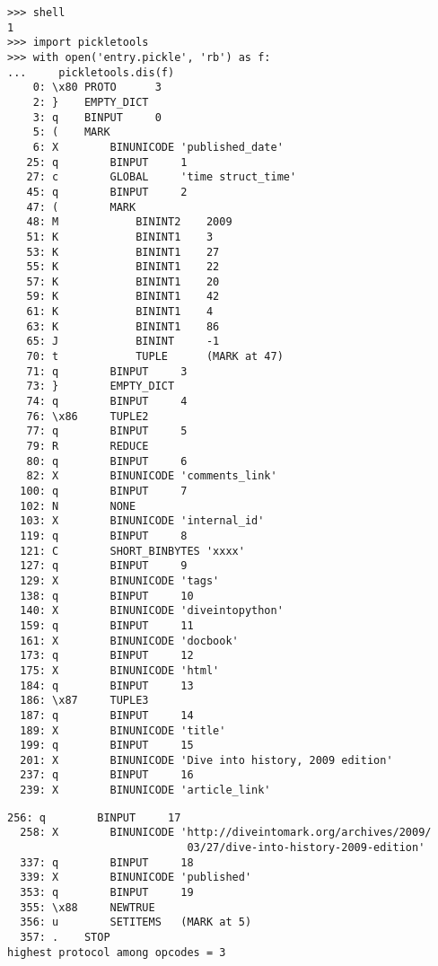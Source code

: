 \noindent\begin{minipage}{\textwidth}
\begin{lstlisting}[mathescape=False]
>>> shell
1
>>> import pickletools
>>> with open('entry.pickle', 'rb') as f:
...     pickletools.dis(f)
    0: \x80 PROTO      3
    2: }    EMPTY_DICT
    3: q    BINPUT     0
    5: (    MARK
    6: X        BINUNICODE 'published_date'
   25: q        BINPUT     1
   27: c        GLOBAL     'time struct_time'
   45: q        BINPUT     2
   47: (        MARK
   48: M            BININT2    2009
   51: K            BININT1    3
   53: K            BININT1    27
   55: K            BININT1    22
   57: K            BININT1    20
   59: K            BININT1    42
   61: K            BININT1    4
   63: K            BININT1    86
   65: J            BININT     -1
   70: t            TUPLE      (MARK at 47)
   71: q        BINPUT     3
   73: }        EMPTY_DICT
   74: q        BINPUT     4
   76: \x86     TUPLE2
   77: q        BINPUT     5
   79: R        REDUCE
   80: q        BINPUT     6
   82: X        BINUNICODE 'comments_link'
  100: q        BINPUT     7
  102: N        NONE
  103: X        BINUNICODE 'internal_id'
  119: q        BINPUT     8
  121: C        SHORT_BINBYTES 'xxxx'
  127: q        BINPUT     9
  129: X        BINUNICODE 'tags'
  138: q        BINPUT     10
  140: X        BINUNICODE 'diveintopython'
  159: q        BINPUT     11
  161: X        BINUNICODE 'docbook'
  173: q        BINPUT     12
  175: X        BINUNICODE 'html'
  184: q        BINPUT     13
  186: \x87     TUPLE3
  187: q        BINPUT     14
  189: X        BINUNICODE 'title'
  199: q        BINPUT     15
  201: X        BINUNICODE 'Dive into history, 2009 edition'
  237: q        BINPUT     16
  239: X        BINUNICODE 'article_link'
\end{lstlisting}
\end{minipage}

\noindent\begin{minipage}{\textwidth}
\begin{lstlisting}[mathescape=False]
  256: q        BINPUT     17
  258: X        BINUNICODE 'http://diveintomark.org/archives/2009/
                            03/27/dive-into-history-2009-edition'
  337: q        BINPUT     18
  339: X        BINUNICODE 'published'
  353: q        BINPUT     19
  355: \x88     NEWTRUE
  356: u        SETITEMS   (MARK at 5)
  357: .    STOP
highest protocol among opcodes = 3
\end{lstlisting}
\end{minipage}

